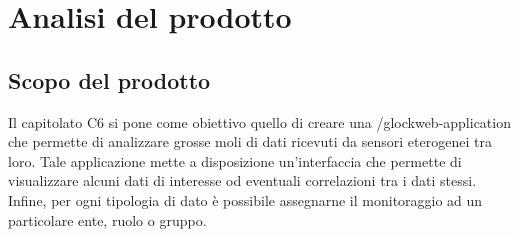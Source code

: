 \section{Analisi del prodotto}
	\subsection{Scopo del prodotto}
		Il capitolato C6 si pone come obiettivo quello di creare una /glock{web-application} che permette di analizzare grosse moli di dati ricevuti da sensori eterogenei tra loro. Tale applicazione mette a disposizione un'interfaccia che permette di visualizzare alcuni dati di interesse od eventuali correlazioni tra i dati stessi. Infine, per ogni tipologia di dato è possibile assegnarne il monitoraggio ad un particolare ente, ruolo o gruppo.
		
